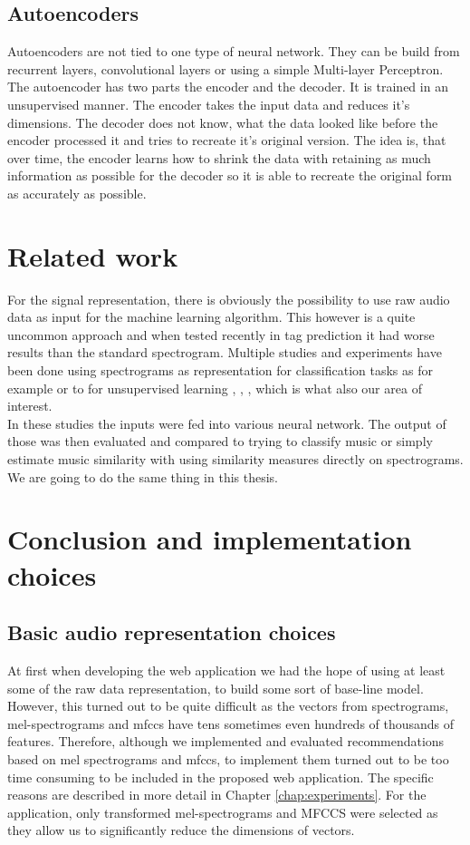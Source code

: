 \subsection{Autoencoders}
Autoencoders are not tied to one type of neural network. They can be build from recurrent layers, convolutional layers or using a simple Multi-layer Perceptron. The autoencoder has two parts the encoder and the decoder. It is trained in an unsupervised manner. The encoder takes the input data and reduces it's dimensions. The decoder does not know, what the data looked like before the encoder processed it and tries to recreate it's original version. The idea is, that over time, the encoder learns how to shrink the data with retaining as much information as possible for the decoder so it is able to recreate the original form as accurately as possible. 

\section{Related work}\label{sec:audio_related_work}
For the signal representation, there is obviously the possibility to use raw audio data as input for the machine learning algorithm. This however is a quite uncommon approach and when tested recently in tag prediction \cite{6854950} it had worse results than the standard spectrogram. Multiple studies and experiments have been done using spectrograms as representation for classification tasks as for example \cite{wang2014improving} or to for unsupervised learning \cite{van2013deep}, \cite{Ramakrishnan2017song2V}, \cite{NIPS2009_3674}, which is what also our area of interest. \\
In these studies the inputs were fed into various neural network. The output of those was then evaluated and compared to trying to classify music or simply estimate music similarity with using similarity measures directly on spectrograms. We are going to do the same thing in this thesis.

\section{Conclusion and implementation choices}

\subsection{Basic audio representation choices}
At first when developing the web application we had the hope of using at least some of the raw data representation, to build some sort of base-line model. However, this turned out to be quite difficult as the vectors from spectrograms, mel-spectrograms and mfccs have tens sometimes even hundreds of thousands of features. Therefore, although we implemented and evaluated recommendations based on mel spectrograms and mfccs, to implement them turned out to be too time consuming to be included in the proposed web application. The specific reasons are described in more detail in Chapter \ref{chap:experiments}. For the application, only transformed mel-spectrograms and MFCCS were selected as they allow us to significantly reduce the dimensions of vectors.



